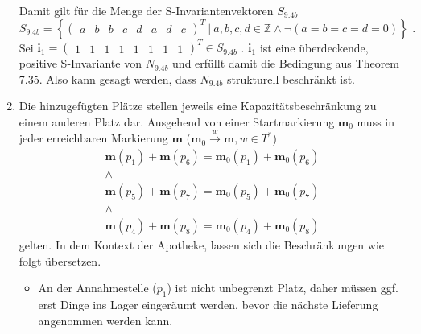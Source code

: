 \documentclass[a4paper]{scrartcl}
\begin{document}
\begin{enumerate}
        Damit gilt für die Menge der S-Invariantenvektoren $S_{9.4b}$
        \begin{equation}
            S_{9.4b} = \left\{ 
                \begin{pmatrix}
                    a & b & b & c & d & a & d & c
                \end{pmatrix}^T
                \ \vert \ 
                a, b, c, d \in \mathbb{Z}
                \land
                \lnot \left( a = b = c = d = 0 \right)
            \right\}
            \text{ .}
        \end{equation}
        Sei $\textbf{i}_1 =
        \begin{pmatrix}
            1 & 1 & 1 & 1 & 1 & 1 & 1 & 1
        \end{pmatrix}^T \in S_{9.4b}$
        .
        $\textbf{i}_1$ ist eine überdeckende, positive S-Invariante von $N_{9.4b}$ und
        erfüllt damit die Bedingung aus Theorem 7.35.
        Also kann gesagt werden, dass $N_{9.4b}$ strukturell beschränkt ist.

    \item
        Die hinzugefügten Plätze stellen jeweils eine Kapazitätsbeschränkung zu
        einem anderen Platz dar.
        Ausgehend von einer Startmarkierung $\textbf{m}_0$ muss in jeder
        erreichbaren Markierung $\textbf{m}$
        ($\textbf{m}_0 \stackrel{w}{\to} \textbf{m}, w \in T^*$)
        \begin{equation}
            \begin{gathered}
                \textbf{m}(p_1) + \textbf{m}(p_6) = \textbf{m}_0(p_1) + \textbf{m}_0(p_6) \\
                \land \\
                \textbf{m}(p_5) + \textbf{m}(p_7) = \textbf{m}_0(p_5) + \textbf{m}_0(p_7) \\
                \land \\
                \textbf{m}(p_4) + \textbf{m}(p_8) = \textbf{m}_0(p_4) + \textbf{m}_0(p_8)
            \end{gathered}
        \end{equation}
        gelten.
        In dem Kontext der Apotheke, lassen sich die Beschränkungen wie folgt
        übersetzen.
        \begin{itemize}
            \item
                An der Annahmestelle ($p_1$) ist nicht unbegrenzt Platz, daher
                müssen ggf. erst Dinge ins Lager eingeräumt werden, bevor die
                nächste Lieferung angenommen werden kann.


\end{itemize}
\end{enumerate}
\end{document}
